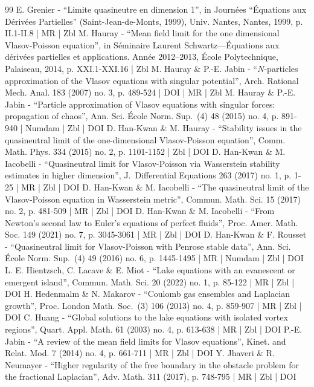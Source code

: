 \documentclass[10pt]{amsart}
\theoremstyle{plain}
\theoremstyle{definition}
\begin{document}
\begin{thebibliography}{99}
E. Grenier - “Limite quasineutre en dimension 1”, in Journées “Équations aux Dérivées Partielles” (Saint-Jean-de-Monts, 1999), Univ. Nantes, Nantes, 1999, p. II.1-II.8 | MR | Zbl
M. Hauray - “Mean field limit for the one dimensional Vlasov-Poisson equation”, in Séminaire Laurent Schwartz—Équations aux dérivées partielles et applications. Année 2012–2013, École Polytechnique, Palaiseau, 2014, p. XXI.1-XXI.16 | Zbl
M. Hauray \& P.-E. Jabin - “$N$-particles approximation of the Vlasov equations with singular potential”, Arch. Rational Mech. Anal. 183 (2007) no. 3, p. 489-524 | DOI | MR | Zbl
M. Hauray \& P.-E. Jabin - “Particle approximation of Vlasov equations with singular forces: propagation of chaos”, Ann. Sci. École Norm. Sup. (4) 48 (2015) no. 4, p. 891-940 | Numdam | Zbl | DOI
D. Han-Kwan \& M. Hauray - “Stability issues in the quasineutral limit of the one-dimensional Vlasov-Poisson equation”, Comm. Math. Phys. 334 (2015) no. 2, p. 1101-1152 | Zbl | DOI
D. Han-Kwan \& M. Iacobelli - “Quasineutral limit for Vlasov-Poisson via Wasserstein stability estimates in higher dimension”, J. Differential Equations 263 (2017) no. 1, p. 1-25 | MR | Zbl | DOI
D. Han-Kwan \& M. Iacobelli - “The quasineutral limit of the Vlasov-Poisson equation in Wasserstein metric”, Commun. Math. Sci. 15 (2017) no. 2, p. 481-509 | MR | Zbl | DOI
D. Han-Kwan \& M. Iacobelli - “From Newton’s second law to Euler’s equations of perfect fluids”, Proc. Amer. Math. Soc. 149 (2021) no. 7, p. 3045-3061 | MR | Zbl | DOI
D. Han-Kwan \& F. Rousset - “Quasineutral limit for Vlasov-Poisson with Penrose stable data”, Ann. Sci. École Norm. Sup. (4) 49 (2016) no. 6, p. 1445-1495 | MR | Numdam | Zbl | DOI
L. E. Hientzsch, C. Lacave \& E. Miot - “Lake equations with an evanescent or emergent island”, Commun. Math. Sci. 20 (2022) no. 1, p. 85-122 | MR | Zbl | DOI
H. Hedenmalm \& N. Makarov - “Coulomb gas ensembles and Laplacian growth”, Proc. London Math. Soc. (3) 106 (2013) no. 4, p. 859-907 | MR | Zbl | DOI
C. Huang - “Global solutions to the lake equations with isolated vortex regions”, Quart. Appl. Math. 61 (2003) no. 4, p. 613-638 | MR | Zbl | DOI
P.-E. Jabin - “A review of the mean field limits for Vlasov equations”, Kinet. and Relat. Mod. 7 (2014) no. 4, p. 661-711 | MR | Zbl | DOI
Y. Jhaveri \& R. Neumayer - “Higher regularity of the free boundary in the obstacle problem for the fractional Laplacian”, Adv. Math. 311 (2017), p. 748-795 | MR | Zbl | DOI

\end{thebibliography}
\end{document}
